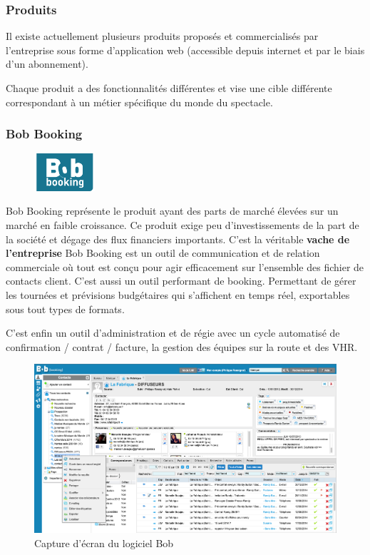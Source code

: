 \subsubsection{Produits}
Il existe actuellement plusieurs produits proposés et commercialisés par l'entreprise sous forme d'application web (accessible depuis internet et par le biais d'un abonnement).

Chaque produit a des fonctionnalités différentes et vise une cible différente correspondant à un métier spécifique du monde du spectacle.

\newpage


\subsubsection{Bob Booking}

\begin{figure}[h!]
	\centering
	\includegraphics[width=0.2\textwidth]{assets/booking.png}
\end{figure}


Bob Booking représente le produit ayant des parts de marché élevées sur un marché en faible croissance. 
Ce produit exige peu d'investissements de la part de la société et dégage des flux financiers importants.
C'est la véritable \textbf{\gls{vache} de l'entreprise} 
\jumpTwo
Bob Booking est un outil de communication et de relation commerciale où tout est conçu pour agir efficacement sur l’ensemble des fichier de contacts client.
C’est aussi un outil performant de booking.
Permettant de gérer les tournées et prévisions budgétaires qui s’affichent en temps réel, exportables sous tout types de formats.

C’est enfin un outil d’administration et de régie avec un cycle automatisé de confirmation / contrat / facture, la gestion des équipes sur la route et des VHR.



\begin{figure}[h!]
    \centering
    \includegraphics[width=1\textwidth]{assets/bob_screenshot.png}
    \caption{Capture d'écran du logiciel Bob}
    \label{fig:my_label}
\end{figure}

